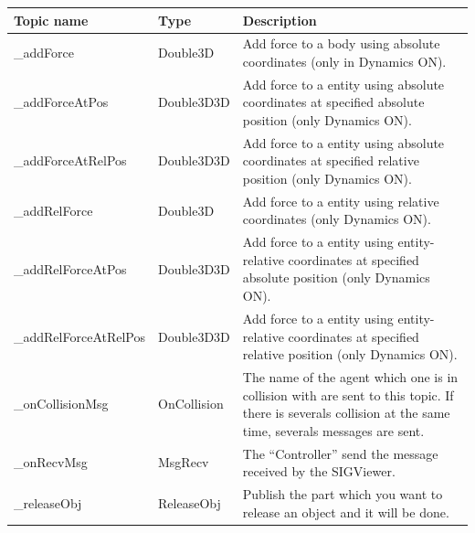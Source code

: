 \documentclass[notitlepage]{report}
\begin{document}
\begin{supertabular}{|p{3cm}|p{4.5cm}|p{7cm}|}
	\hline
    Topic name & Type & Description \\
  	\hline
  	\_addForce & 
  		Double3D
  		& Add force to a body using absolute coordinates (only in Dynamics ON).\\
  	\hline
  	\_addForceAtPos & 
  		Double3D3D
  		& Add force to a entity using absolute coordinates at specified absolute position (only Dynamics ON).\\
  	\hline
  	\_addForceAtRelPos & 
  		Double3D3D
  		& Add force to a entity using absolute coordinates at specified relative position (only Dynamics ON).\\
  	\hline
  	\_addRelForce & 
  		Double3D
  		& Add force to a entity using relative coordinates (only Dynamics ON).\\
  	\hline
  	\_addRelForceAtPos & 
  		Double3D3D
  		& Add force to a entity using entity-relative coordinates at specified absolute position (only Dynamics ON).\\
  	\hline
  	\_addRelForceAtRelPos & 
  		Double3D3D
  		& Add force to a entity using entity-relative coordinates at specified relative position (only Dynamics ON).\\
  	\hline
  	\_onCollisionMsg &
  		\medskip
  		OnCollision & The name of the agent which one is in collision with are sent to this topic. If there is severals collision at the same time, severals messages are sent.\\
  	\hline  	
  	\_onRecvMsg &
  		MsgRecv
  		\medskip & The ``Controller'' send the message received by the SIGViewer.\\
  	\hline
  	\_releaseObj & ReleaseObj & Publish the part which you want to release an object and it will be done.\\
  	\hline
  	

\end{supertabular}
\end{document}
